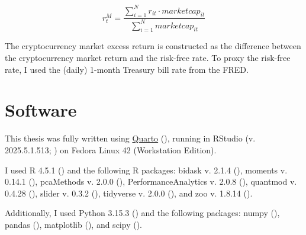 \documentclass[
  12pt,
  a4paper,
  openany]{scrbook}
\begin{document}
\[
r_t^M = \frac{\sum_{i=1}^N r_{it} \cdot marketcap_{it}}
             {\sum_{i=1}^N marketcap_{it} }
\]

The cryptocurrency market excess return is constructed as the difference
between the cryptocurrency market return and the risk-free rate. To
proxy the risk-free rate, I used the (daily) 1-month Treasury bill rate
from the FRED.

\section{Software}\label{sec-software}

This thesis was fully written using \href{https://quarto.org/}{Quarto}
(), running in RStudio
(v. 2025.5.1.513; ) on Fedora
Linux 42 (Workstation Edition).

I used R 4.5.1 () and the
following R packages: bidask v. 2.1.4 (), moments v. 0.14.1 (), pcaMethods v. 2.0.0
(),
PerformanceAnalytics v. 2.0.8
(), quantmod
v. 0.4.28 (), slider v.
0.3.2 (), tidyverse v. 2.0.0
(), and zoo v. 1.8.14
().

Additionally, I used Python 3.15.3 () and the following packages: numpy
(), pandas
(),
matplotlib (), and scipy
().


\backmatter
\end{document}
